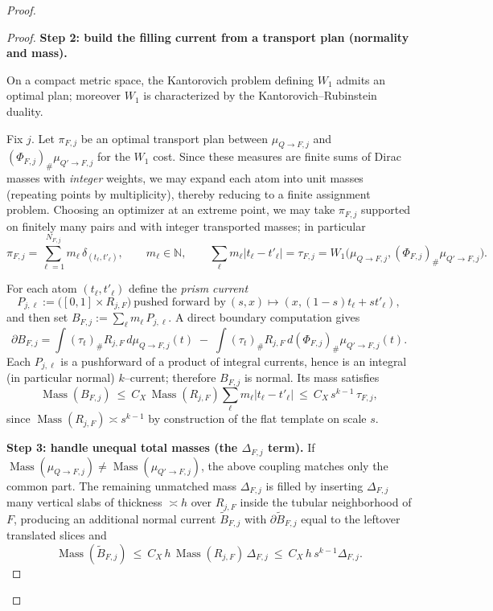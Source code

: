 \documentclass[11pt]{article}
\numberwithin{equation}{section}  %
\theoremstyle{plain}
\theoremstyle{definition}
\theoremstyle{remark}
\newcommand{\N}{\mathbb{N}}
\DeclareMathOperator{\Mass}{Mass}
\begin{document}
\begin{proof}
\begin{proof}
\smallskip\noindent
\textbf{Step 2: build the filling current from a transport plan (normality and mass).}

On a compact metric space, the Kantorovich problem defining $W_1$ admits an optimal plan; moreover
$W_1$ is characterized by the Kantorovich--Rubinstein duality. \cite{Villani03}

Fix $j$.  Let $\pi_{F,j}$ be an optimal transport plan between $\mu_{Q\to F,j}$ and $(\Phi_{F,j})_\#\mu_{Q'\to F,j}$
for the $W_1$ cost.  Since these measures are finite sums of Dirac masses with \emph{integer} weights,
we may expand each atom into unit masses (repeating points by multiplicity), thereby reducing to a finite assignment problem.
Choosing an optimizer at an extreme point, we may take $\pi_{F,j}$ supported on finitely many pairs and with integer
transported masses; in particular
\[
\pi_{F,j}=\sum_{\ell=1}^{N_{F,j}} m_\ell\,\delta_{(t_\ell,t'_\ell)},\qquad m_\ell\in\N,
\qquad \sum_\ell m_\ell |t_\ell-t'_\ell|=\tau_{F,j}
 =W_1\bigl(\mu_{Q\to F,j},(\Phi_{F,j})_\#\mu_{Q'\to F,j}\bigr).
\]

For each atom $(t_\ell,t'_\ell)$ define the \emph{prism current}
\[
P_{j,\ell}:=\bigl([0,1]\times R_{j,F}\bigr)\ \text{pushed forward by}\ (s,x)\mapsto (x,(1-s)t_\ell+s t'_\ell),
\]
and then set $B_{F,j}:=\sum_\ell m_\ell\,P_{j,\ell}$.
A direct boundary computation gives
\[
\partial B_{F,j}=\int (\tau_t)_\# R_{j,F}\,d\mu_{Q\to F,j}(t)\;-\;\int (\tau_t)_\# R_{j,F}\,d(\Phi_{F,j})_\#\mu_{Q'\to F,j}(t).
\]
Each $P_{j,\ell}$ is a pushforward of a product of integral currents, hence is an integral (in particular normal)
$k$--current; therefore $B_{F,j}$ is normal.  Its mass satisfies
\[
\Mass(B_{F,j})\ \le\ C_X\,\Mass(R_{j,F})\sum_\ell m_\ell |t_\ell-t'_\ell|
\ \le\ C_X\,s^{k-1}\,\tau_{F,j},
\]
since $\Mass(R_{j,F})\asymp s^{k-1}$ by construction of the flat template on scale $s$.

\smallskip\noindent
\textbf{Step 3: handle unequal total masses (the $\Delta_{F,j}$ term).}
If $\Mass(\mu_{Q\to F,j})\neq \Mass(\mu_{Q'\to F,j})$, the above coupling matches only the common part.
The remaining unmatched mass $\Delta_{F,j}$ is filled by inserting $\Delta_{F,j}$ many vertical slabs of thickness
$\asymp h$ over $R_{j,F}$ inside the tubular neighborhood of $F$, producing an additional normal current
$\widetilde B_{F,j}$ with $\partial \widetilde B_{F,j}$ equal to the leftover translated slices and
\[
\Mass(\widetilde B_{F,j})\ \le\ C_X\,h\,\Mass(R_{j,F})\,\Delta_{F,j}\ \le\ C_X\,h\,s^{k-1}\Delta_{F,j}.
\]


\end{proof}
\end{proof}
\end{document}
